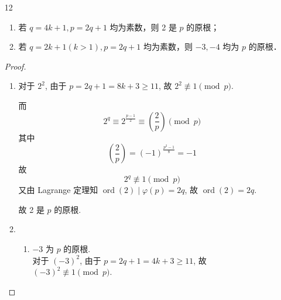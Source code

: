 \begin{enumerate}
    \begin{proof}
        使用反证法.

        若 $g$ 为 $p^k$ 的原根, 则 $g+p$ 亦为 $p^k$ 的原根. $g$ 为 $p$ 的原根. \\
        若 $g^{p-1} \equiv 1 \pmod{p^2}$, 则
        \begin{align*}
        (g+p)^{p-1} &\equiv g^{p-1} + \binom{p-1}{1} g^{p-2} p \pmod{p^2} \\
        &\equiv 1 + (p-1)g^{p-2}p \pmod{p^2}
        \end{align*}
        由于 $p^2 \nmid (p-1)g^{p-2}p$, 故
        \[ (g+p)^{p-1} \not\equiv 1 \pmod{p^2} \]
        因此存在 $p^k$ 的原根 $g$ 使之为 $p$ 的原根且 $g^{p-1} \not\equiv 1 \pmod{p^2}$.
    \end{proof}


    \item[12] \begin{enumerate}
        \item 若 $q=4 k+1, p=2 q+1$ 均为素数，则 2 是 $p$ 的原根；
        \item 若 $q=2 k+1(k>1), p=2 q+1$ 均为素数，则 $-3,-4$ 均为 $p$ 的原根．
    \end{enumerate}

\begin{proof}
    \begin{enumerate}
        \item 对于 $2^2$, 由于 $p=2q+1 = 8k+3 \ge 11$, 故 $2^2 \not\equiv 1 \pmod p$. %
        
        而
        \begin{equation*}
            2^q \equiv 2^{\frac{p-1}{2}} \equiv \left(\frac{2}{p}\right) \pmod p
        \end{equation*}
        其中
        \begin{equation*}
            \left(\frac{2}{p}\right) = (-1)^{\frac{p^2-1}{8}} = -1
        \end{equation*}
        故
        \begin{equation*}
            2^q \not\equiv 1 \pmod p
        \end{equation*}
        又由 Lagrange 定理知 $\operatorname{ord}(2) \mid \varphi(p) = 2q$, 故 $\operatorname{ord}(2) = 2q$.
        
        故 2 是 $p$ 的原根.
        \item 
        \begin{enumerate}
            \item $-3$ 为 $p$ 的原根. \\
            对于 $(-3)^2$, 由于 $p=2q+1 = 4k+3 \ge 11$, 故 $(-3)^2 \not\equiv 1 \pmod p$.
            

\end{enumerate}
\end{enumerate}
\end{proof}
\end{enumerate}
